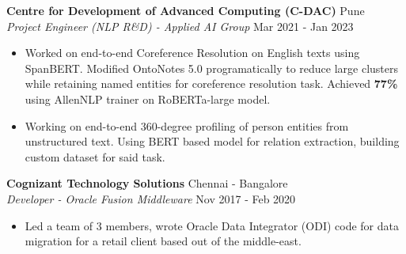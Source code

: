 \documentclass[a4paper]{article}
\begin{document}
\vspace{1mm}
\textbf{Centre for Development of Advanced Computing (C-DAC)} \hfill Pune\\
\textit{Project Engineer (NLP R\&D) - Applied AI Group} \hfill Mar 2021 - Jan 2023\\
\vspace{-1mm}
\begin{itemize} \itemsep 1pt
    \item Worked on end-to-end Coreference Resolution on English texts using SpanBERT. Modified OntoNotes 5.0 programatically to reduce large clusters while retaining named entities for coreference resolution task. Achieved \textbf{77\%} using AllenNLP trainer on RoBERTa-large model.

    \item Working on end-to-end 360-degree profiling of person entities from unstructured text. Using BERT based model for relation extraction, building custom dataset for said task.
\end{itemize}

\vspace*{2mm}

\textbf{Cognizant Technology Solutions} \hfill Chennai - Bangalore\\
\textit{Developer - Oracle Fusion Middleware} \hfill Nov 2017 - Feb 2020\\
\vspace{-1mm}
\begin{itemize} \itemsep 1pt
    \item Led a team of 3 members, wrote Oracle Data Integrator (ODI) code for data migration for a retail client based out of the middle-east.
\end{itemize}
\end{document}
